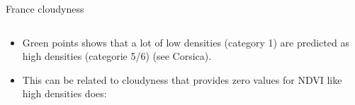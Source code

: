\documentclass[c]{beamer}
\begin{document}
\begin{frame}
\begin{columns}
\begin{column}{0.5\textwidth}
\begin{overlayarea}{\linewidth}{4cm}
  \end{overlayarea}
  \begin{overlayarea}{\linewidth}{0.5cm}
    \centering
    \tiny France cloudyness\par
  \end{overlayarea}
 \end{column}
\end{columns}
{\tiny
\begin{itemize}
\item Green points shows that a lot of low densities (category 1) are predicted as high densities (categorie 5/6) (see Corsica). 
\item This can be related to cloudyness that provides zero values for NDVI like high densities does:
\end{itemize}
\begin{columns}



\end{columns}}
\end{frame}
\end{document}
